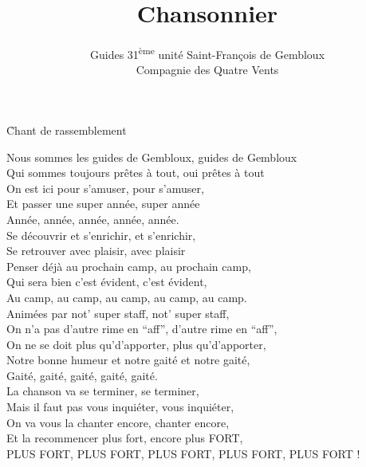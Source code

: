 \documentclass{novel}
\title     {Chansonnier}
\subtitle  {Guides 31\textsuperscript{ème} unité Saint-François de Gembloux\\ Compagnie des Quatre Vents}
\author    {}
\begin{document}

\renewcommand{\cftchapleader}{\cftdotfill{\cftdotsep}}
\toc


\h*{Chant de rassemblement}
\setcounter{page}{1}


Nous sommes les guides de Gembloux, guides de Gembloux\\
Qui sommes toujours prêtes à tout, oui prêtes à tout\\
On est ici pour s’amuser, pour s’amuser,\\
Et passer une super année, super année\\
Année, année, année, année, année.\\

Se découvrir et s’enrichir, et s’enrichir,\\
Se retrouver avec plaisir, avec plaisir\\
Penser déjà au prochain camp, au prochain camp,\\
Qui sera bien c’est évident, c’est évident,\\
Au camp, au camp, au camp, au camp, au camp.\\


Animées par not’ super staff, not’ super staff,\\
On n’a pas d’autre rime en “aff”, d’autre rime en “aff”,\\
On ne se doit plus qu’d’apporter, plus qu’d’apporter,\\
Notre bonne humeur et notre gaité et notre gaité,\\
Gaité, gaité, gaité, gaité, gaité.\\


La chanson va se terminer, se terminer,\\
Mais il faut pas vous inquiéter, vous inquiéter,\\
On va vous la chanter encore, chanter encore,\\
Et la recommencer plus fort, encore plus FORT,\\
PLUS FORT, PLUS FORT, PLUS FORT, PLUS FORT, PLUS FORT !
\end{document}
